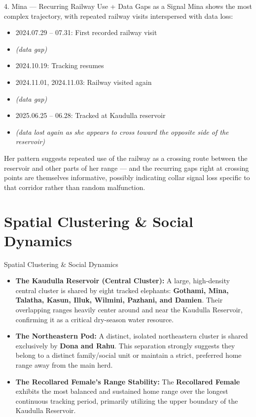 \documentclass{beamer}
\begin{document}
	\begin{frame}
		\begin{block}{4. Mina --- Recurring Railway Use + Data Gaps as a Signal}
			Mina shows the most complex trajectory, with repeated railway visits interspersed with data loss:
			\begin{itemize}[label=\textbullet,nosep]
				\item 2024.07.29 -- 07.31: First recorded railway visit
				\item \textit{(data gap)}
				\item 2024.10.19: Tracking resumes
				\item 2024.11.01, 2024.11.03: Railway visited again
				\item \textit{(data gap)}
				\item 2025.06.25 -- 06.28: Tracked at Kaudulla reservoir
				\item \textit{(data lost again as she appears to cross toward the opposite side of the reservoir)}
			\end{itemize}
			Her pattern suggests repeated use of the railway as a crossing route between the reservoir and other parts of her range --- and the recurring gaps right at crossing points are themselves informative, possibly indicating collar signal loss specific to that corridor rather than random malfunction.
		\end{block}
	\end{frame}
	
	
	
	\section{Spatial Clustering \& Social Dynamics}
	\begin{frame}{Spatial Clustering \& Social Dynamics}
		\begin{itemize}[label=\textbullet]
			\item \textbf{The Kaudulla Reservoir (Central Cluster):} A large, high-density central cluster is shared by eight tracked elephants: \textbf{Gothami, Mina, Talatha, Kasun, Illuk, Wilmini, Pazhani, and Damien}. Their overlapping ranges heavily center around and near the Kaudulla Reservoir, confirming it as a critical dry-season water resource.
			\item \textbf{The Northeastern Pod:} A distinct, isolated northeastern cluster is shared exclusively by \textbf{Dona and Rahu}. This separation strongly suggests they belong to a distinct family/social unit or maintain a strict, preferred home range away from the main herd.
			\item \textbf{The Recollared Female's Range Stability:} The \textbf{Recollared Female} exhibits the most balanced and sustained home range over the longest continuous tracking period, primarily utilizing the upper boundary of the Kaudulla Reservoir.
		\end{itemize}
	\end{frame}
	
\end{document}
